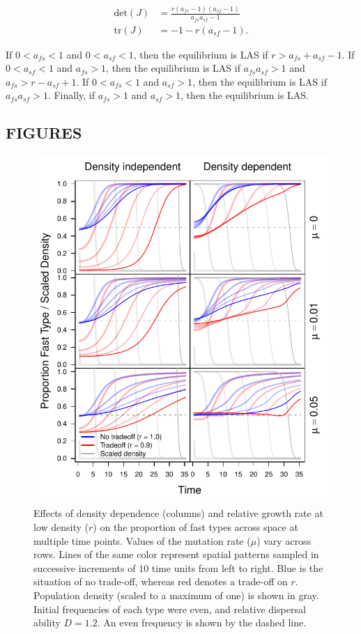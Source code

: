\documentclass[11pt]{article}
\begin{document}
\vspace*{-22pt}
\begin{subequations}
\begin{align}
\textrm{det}(J) &= \frac{r(a_{fs}-1)(a_{sf}-1)}{a_{fs}a_{sf}-1} \\
\textrm{tr}(J) &= -1-r(a_{sf}-1) .
\end{align}
\end{subequations}

\noindent If $0 < a_{fs} < 1$ and $0 < a_{sf} < 1$, then the equilibrium is LAS if $r > a_{fs} + a_{sf} - 1$. If $0 < a_{sf} < 1$ and $a_{fs}>1$, then the equilibrium is LAS if $a_{fs}a_{sf} > 1$ and $a_{fs} > r - a_{sf} + 1$. If $0 < a_{fs} < 1$ and $a_{sf}>1$, then the equilibrium is LAS if $a_{fs}a_{sf} > 1$. Finally, if $a_{fs} > 1$ and $a_{sf} > 1$, then the equilibrium is LAS.


\newpage
\subsection*{FIGURES}

\begin{figure}[!ht]
\begin{center}
\includegraphics[width=4.68in]{../output/clines_r.pdf}
\end{center}
\caption{
Effects of density dependence (columns) and relative growth rate at low density ($r$) on the proportion of fast types across space at multiple time points. Values of the mutation rate ($\mu$) vary across rows. Lines of the same color represent spatial patterns sampled in successive increments of $10$ time units from left to right. Blue is the situation of no trade-off, whereas red denotes a trade-off on $r$. Population density (scaled to a maximum of one) is shown in gray. Initial frequencies of each type were even, and relative dispersal ability $D=1.2$. An even frequency is shown by the dashed line.
}
\label{fcline_r}
\end{figure}
\end{document}
